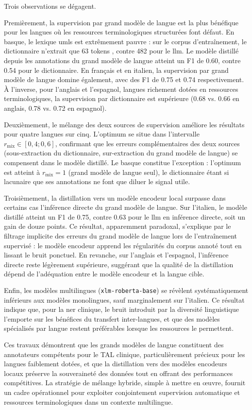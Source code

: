 Trois observations se dégagent.

Premièrement, la supervision par grand modèle de langue est la plus bénéfique pour les langues où les ressources terminologiques structurées font défaut.
En basque, le lexique \gls{umls} est extrêmement pauvre : sur le corpus d'entraînement, le dictionnaire n'extrait que \num{63} tokens \iclin, contre \num{482} pour le \gls{llm}.
Le modèle distillé depuis les annotations du grand modèle de langue atteint un F1 de \num{0,60}, contre \num{0,54} pour le dictionnaire.
En français et en italien, la supervision par grand modèle de langue domine également, avec des F1 de \num{0,75} et \num{0,74} respectivement.
À l'inverse, pour l'anglais et l'espagnol, langues richement dotées en ressources terminologiques, la supervision par dictionnaire est supérieure (\num{0,68} vs. \num{0,66} en anglais, \num{0,78} vs. \num{0,72} en espagnol).

Deuxièmement, le mélange des deux sources de supervision améliore les résultats pour quatre langues sur cinq.
L'optimum se situe dans l'intervalle $r_{\text{mix}} \in [0{,}4 ; 0{,}6]$, confirmant que les erreurs complémentaires des deux sources (sous-extraction du dictionnaire, sur-extraction du grand modèle de langue) se compensent dans le modèle distillé.
Le basque constitue l'exception : l'optimum est atteint à $r_{\text{mix}} = 1$ (grand modèle de langue seul), le dictionnaire étant si lacunaire que ses annotations ne font que diluer le signal utile.

Troisièmement, la distillation vers un modèle encodeur local surpasse dans certains cas l'inférence directe du grand modèle de langue.
Sur l'italien, le modèle distillé atteint un F1 de \num{0,75}, contre \num{0,63} pour le \gls{llm} en inférence directe, soit un gain de douze points.
Ce résultat, apparemment paradoxal, s'explique par le filtrage implicite des erreurs du grand modèle de langue lors de l'entraînement supervisé : le modèle encodeur apprend les régularités du corpus annoté tout en lissant le bruit ponctuel.
En revanche, sur l'anglais et l'espagnol, l'inférence directe reste légèrement supérieure, suggérant que la qualité de la distillation dépend de l'adéquation entre le modèle encodeur et la langue cible.

Enfin, les modèles multilingues (\verb|xlm-roberta-base|) se révèlent systématiquement inférieurs aux modèles monolingues, sauf marginalement sur l'italien.
Ce résultat indique que, pour la \gls{ner} clinique, le bruit introduit par la diversité linguistique l'emporte sur les bénéfices du transfert inter-langues, et que des modèles spécialisés par langue restent préférables lorsque les ressources le permettent.

Ces travaux démontrent que les grands modèles de langue constituent des annotateurs compétents pour le TAL clinique, particulièrement précieux pour les langues faiblement dotées, et que la distillation vers des modèles encodeurs locaux préserve la souveraineté des données tout en offrant des performances compétitives.
La stratégie de mélange hybride, simple à mettre en œuvre, fournit un cadre opérationnel pour exploiter conjointement supervision automatique et ressources terminologiques dans un contexte multilingue.
